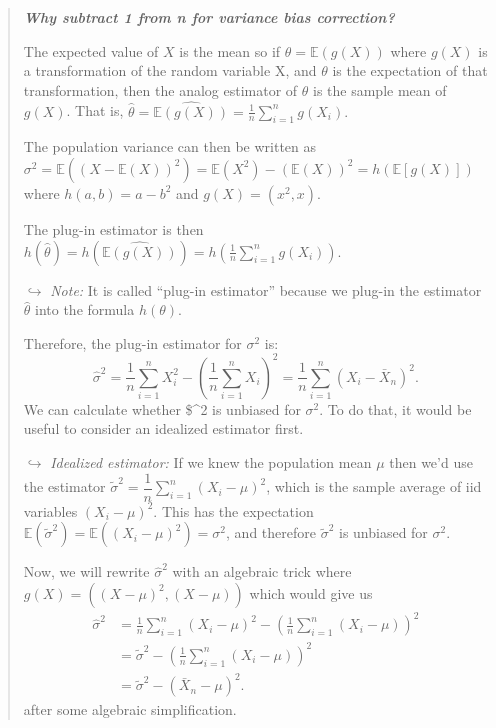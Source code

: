 \documentclass[
]{article}
\begin{document}
\begin{quote}
\textbf{\emph{Why subtract 1 from n for variance bias correction?}}

The expected value of \(X\) is the mean so if
\(\theta = \mathbb{E}(g(X))\) where \(g(X)\) is a transformation of the
random variable X, and \(\theta\) is the expectation of that
transformation, then the analog estimator of \(\theta\) is the sample
mean of \(g(X)\). That is,
\(\widehat{\theta} = \widehat{\mathbb{E}(g(X))} = \frac{1}{n}\sum_{i=1}^n g(X_i).\)

The population variance can then be written as
\(\sigma^2 = \mathbb{E}\left((X-\mathbb{E}(X))^2\right) = \mathbb{E}(X^2) - (\mathbb{E}(X))^2 = h(\mathbb{E}[g(X)])\)
where \(h(a,b) = a-b^2\) and \(g(X) = (x^2, x).\)

The plug-in estimator is then
\(h(\widehat{\theta}) = h(\widehat{\mathbb{E}(g(X))}) = h\left(\frac{1}{n}\sum_{i=1}^n g(X_i) \right).\)

\(\hookrightarrow\) \emph{Note:} It is called ``plug-in estimator''
because we plug-in the estimator \(\widehat{\theta}\) into the formula
\(h(\theta)\).

Therefore, the plug-in estimator for \(\sigma^2\) is: \[
\widehat{\sigma}^2=\frac{1}{n}\displaystyle\sum_{i=1}^n X_i^2 - \left(\frac{1}{n}\displaystyle\sum_{i=1}^n X_i \right)^2 = \frac{1}{n} \displaystyle\sum_{i=1}^n (X_i - \bar{X}_n)^2.
\] We can calculate whether \$\hat{\sigma}\^{}2 is unbiased for
\(\sigma^2.\) To do that, it would be useful to consider an idealized
estimator first.

\(\hookrightarrow\) \emph{Idealized estimator:} If we knew the
population mean \(\mu\) then we'd use the estimator
\(\widetilde{\sigma}^2 = \dfrac{1}{n}\sum_{i=1}^n(X_i-\mu)^2\), which is
the sample average of iid variables \((X_i - \mu)^2\). This has the
expectation
\(\mathbb{E}(\widetilde{\sigma}^2) = \mathbb{E}\left((X_i - \mu)^2\right) = \sigma^2\),
and therefore \(\widetilde{\sigma}^2\) is unbiased for \(\sigma^2.\)

Now, we will rewrite \(\widehat{\sigma}^2\) with an algebraic trick
where \(g(X) = \left((X-\mu)^2, (X-\mu)\right)\) which would give us \[
\begin{align*}
\widehat{\sigma}^2 &= \frac{1}{n}\displaystyle\sum_{i=1}^n (X_i - \mu)^2 - \left(\frac{1}{n}\displaystyle\sum_{i=1}^n (X_i-\mu) \right)^2 \\[4pt]
&= \widetilde{\sigma}^2 - \left(\frac{1}{n}\displaystyle\sum_{i=1}^n (X_i-\mu)\right)^2 \\[4pt]
&= \widetilde{\sigma}^2 - (\bar{X}_n - \mu)^2.
\end{align*}
\] after some algebraic simplification.


\end{quote}
\end{document}

